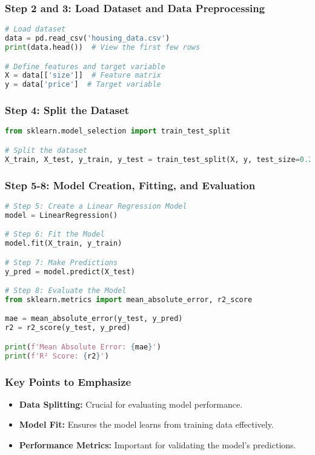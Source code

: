 \documentclass[aspectratio=169]{beamer}
\begin{document}
\begin{frame}[fragile]
    \frametitle{Step 2 and 3: Load Dataset and Data Preprocessing}
    \begin{lstlisting}[language=Python]
# Load dataset
data = pd.read_csv('housing_data.csv')
print(data.head())  # View the first few rows

# Define features and target variable
X = data[['size']]  # Feature matrix
y = data['price']  # Target variable
    \end{lstlisting}
\end{frame}

\begin{frame}[fragile]
    \frametitle{Step 4: Split the Dataset}
    \begin{lstlisting}[language=Python]
from sklearn.model_selection import train_test_split

# Split the dataset
X_train, X_test, y_train, y_test = train_test_split(X, y, test_size=0.2, random_state=42)
    \end{lstlisting}
\end{frame}

\begin{frame}[fragile]
    \frametitle{Step 5-8: Model Creation, Fitting, and Evaluation}
    \begin{lstlisting}[language=Python]
# Step 5: Create a Linear Regression Model
model = LinearRegression()

# Step 6: Fit the Model
model.fit(X_train, y_train)

# Step 7: Make Predictions
y_pred = model.predict(X_test)

# Step 8: Evaluate the Model
from sklearn.metrics import mean_absolute_error, r2_score

mae = mean_absolute_error(y_test, y_pred)
r2 = r2_score(y_test, y_pred)

print(f'Mean Absolute Error: {mae}')
print(f'R² Score: {r2}')
    \end{lstlisting}
\end{frame}

\begin{frame}[fragile]
    \frametitle{Key Points to Emphasize}
    \begin{itemize}
        \item \textbf{Data Splitting:} Crucial for evaluating model performance.
        \item \textbf{Model Fit:} Ensures the model learns from training data effectively.
        \item \textbf{Performance Metrics:} Important for validating the model's predictions.
    \end{itemize}
\end{frame}
\end{document}
